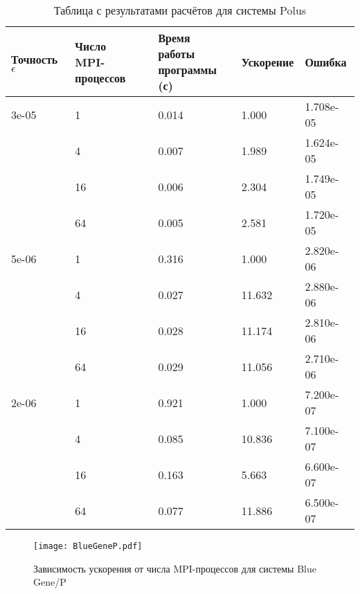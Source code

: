 \documentclass[oneside, final, 12pt]{extarticle}
\newlength{\mygraphwidth}\setlength{\mygraphwidth}{1.0\textwidth}
\begin{document}
\begin{table}[H]
    \centering
    \begin{tabular}{|l|l|l|l|l|}
        \hline
        Точность $ \epsilon $ & \makecell{Число                              \\MPI-процессов} & \makecell{Время работы \\ программы (с)} & Ускорение & Ошибка \\
        \hline
        3e-05                 & 1               & 0.014 & 1.000  & 1.708e-05 \\
        \cline{2-5}
                              & 4               & 0.007 & 1.989  & 1.624e-05 \\
        \cline{2-5}
                              & 16              & 0.006 & 2.304  & 1.749e-05 \\
        \cline{2-5}
                              & 64              & 0.005 & 2.581  & 1.720e-05 \\
        \hline
        5e-06                 & 1               & 0.316 & 1.000  & 2.820e-06 \\
        \cline{2-5}
                              & 4               & 0.027 & 11.632 & 2.880e-06 \\
        \cline{2-5}
                              & 16              & 0.028 & 11.174 & 2.810e-06 \\
        \cline{2-5}
                              & 64              & 0.029 & 11.056 & 2.710e-06 \\
        \hline
        2e-06                 & 1               & 0.921 & 1.000  & 7.200e-07 \\
        \cline{2-5}
                              & 4               & 0.085 & 10.836 & 7.100e-07 \\
        \cline{2-5}
                              & 16              & 0.163 & 5.663  & 6.600e-07 \\
        \cline{2-5}
                              & 64              & 0.077 & 11.886 & 6.500e-07 \\
        \hline
    \end{tabular}
    \caption{Таблица с результатами расчётов для системы Polus}
\end{table}

\begin{figure}[H]
    \centering
    \texttt{[image: BlueGeneP.pdf]}
    \caption{Зависимость ускорения от числа MPI-процессов для системы Blue Gene/P}
\end{figure}
\end{document}
